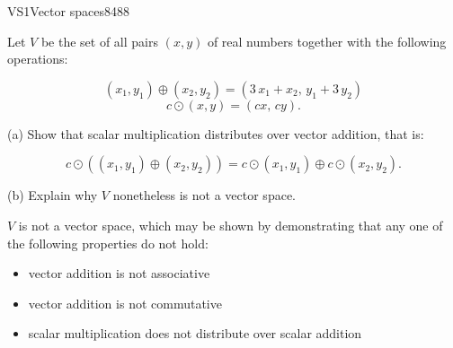 \begin{exercise}{VS1}{Vector spaces}{8488} 
\begin{exerciseStatement} 

 Let \(V\) be the set of all pairs \((x,y)\) of real numbers together with the following operations: 

 \[(x_1,y_1)\oplus (x_2,y_2)=\left(3 \, x_{1} + x_{2},\,y_{1} + 3 \, y_{2}\right)\]\[c \odot (x,y) =\left(c x,\,c y\right).\] 

 (a) Show that scalar multiplication distributes over vector addition, that is: 

 \[
      c\odot \left((x_1,y_1)\oplus(x_2,y_2)\right)=c\odot(x_1,y_1)\oplus c\odot(x_2,y_2).
    \] 

 (b) Explain why \(V\) nonetheless is not a vector space. 

 \end{exerciseStatement}
 \begin{exerciseAnswer} 

 \(V\) is not a vector space, which may be shown by demonstrating that any one of the following properties do not hold: 

 

\begin{itemize}
\item vector addition is not associative
\item vector addition is not commutative
\item scalar multiplication does not distribute over scalar addition
\end{itemize}

     \end{exerciseAnswer}
 \end{exercise}


